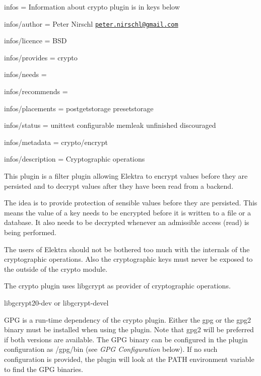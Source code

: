 
\begin{DoxyItemize}
\item infos = Information about crypto plugin is in keys below
\item infos/author = Peter Nirschl \href{mailto:peter.nirschl@gmail.com}{\tt peter.\+nirschl@gmail.\+com}
\item infos/licence = B\+SD
\item infos/provides = crypto
\item infos/needs =
\item infos/recommends =
\item infos/placements = postgetstorage presetstorage
\item infos/status = unittest configurable memleak unfinished discouraged
\item infos/metadata = crypto/encrypt
\item infos/description = Cryptographic operations
\end{DoxyItemize}

This plugin is a filter plugin allowing Elektra to encrypt values before they are persisted and to decrypt values after they have been read from a backend.

The idea is to provide protection of sensible values before they are persisted. This means the value of a key needs to be encrypted before it is written to a file or a database. It also needs to be decrypted whenever an admissible access (read) is being performed.

The users of Elektra should not be bothered too much with the internals of the cryptographic operations. Also the cryptographic keys must never be exposed to the outside of the crypto module.

The crypto plugin uses libgcrypt as provider of cryptographic operations.


\begin{DoxyItemize}
\item {\ttfamily libgcrypt20-\/dev} or {\ttfamily libgcrypt-\/devel}
\end{DoxyItemize}

G\+PG is a run-\/time dependency of the crypto plugin. Either the {\ttfamily gpg} or the {\ttfamily gpg2} binary must be installed when using the plugin. Note that {\ttfamily gpg2} will be preferred if both versions are available. The G\+PG binary can be configured in the plugin configuration as {\ttfamily /gpg/bin} (see {\itshape G\+PG Configuration} below). If no such configuration is provided, the plugin will look at the P\+A\+TH environment variable to find the G\+PG binaries.

